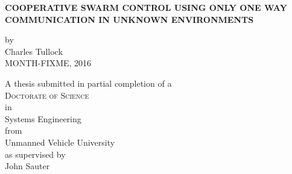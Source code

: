 \begin{titlepage}
	\begin{center}

		\vspace*{1cm}
		 
		\large{ \textbf{ \uppercase{Cooperative swarm control using only one way communication in unknown environments}}}
		
		\vspace{1.5cm}
		
		by\\
		Charles Tullock\\
		MONTH-FIXME, 2016
		
		\vspace{3cm}
		
		A thesis submitted in partial completion of a\\
		\large{\textsc{Doctorate of Science}}\\ 
		in\\
		\large{Systems Engineering}\\
		from\\
		\large{Unmanned Vehicle University}\\
		as supervised by\\
		\large{John Sauter}
		\vfill

	\end{center}
\thispagestyle{empty}
\end{titlepage}

